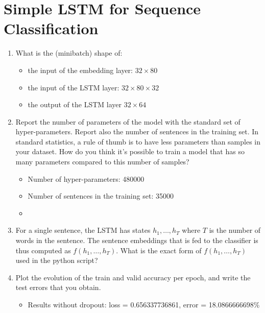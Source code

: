 \documentclass{article} %
\begin{document}
\section{Simple LSTM for Sequence Classification}

\begin{enumerate}
    \item
    What is the (minibatch) shape of:

    \begin{itemize}
        \item
        the input of the embedding layer: $32 \times 80$
        \item
        the input of the LSTM layer: $32 \times 80 \times 32$
        \item
        the output of the LSTM layer $32 \times 64$
    \end{itemize}

    \item
    Report the number of parameters of the model with the standard set of hyper-parameters.
    Report also the number of sentences in the training set. In standard statistics,
    a rule of thumb is to have less parameters than samples in your dataset.
    How do you think it’s possible to train a model that has so many parameters
    compared to this number of samples?

    \begin{itemize}
        \item
        Number of hyper-parameters: 480000
        \item
        Number of sentences in the training set: 35000
        \item
    \end{itemize}

    \item
    For a single sentence, the LSTM has states $h_1, \ldots, h_T$ where $T$ is
    the number of words in the sentence. The sentence embeddings that is fed to
    the classifier is thus computed as $f(h_1, \ldots, h_T)$. What is the exact
    form of $f(h_1, \ldots, h_T)$ used in the python script?

    \item
    Plot the evolution of the train and valid accuracy per epoch, and write the
    test errors that you obtain.

    \begin{itemize}
        \item
        Results without dropout: loss = 0.656337736861, error = 18.0866666698\%


\end{itemize}
\end{enumerate}
\end{document}
